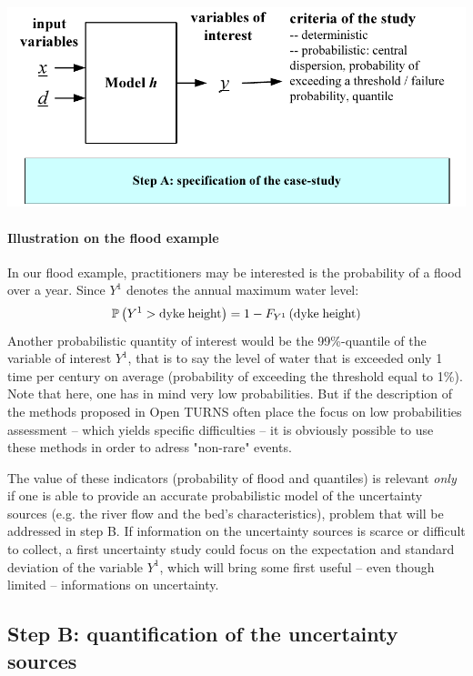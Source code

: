 \begin{center}
  \includegraphics[scale=0.8]{flow2.pdf}
\end{center}

\paragraph{Illustration on the flood example}
\par

In our flood example, practitioners may be interested is the probability of a flood over a year. Since $Y^1$ denotes the annual maximum water level:
$$
\mathbb{P} \left( Y^1 > \textrm{dyke\;height} \right) = 1 - F_{Y^1} \left( \textrm{dyke\;height} \right)
$$
Another probabilistic quantity of interest would be the 99\%-quantile of the variable of interest $Y^1$, that is to say the level of water that is exceeded only 1 time per century on average (probability of exceeding the threshold equal to 1\%). Note that here, one has in mind very low probabilities. But if the description of the methods proposed in Open TURNS often place the focus on low probabilities assessment -- which yields specific difficulties -- it is obviously possible to use these methods in order to adress "non-rare" events.

The value of these indicators (probability of flood and quantiles) is relevant {\em only} if one is able to provide an accurate probabilistic model of the uncertainty sources (e.g. the river flow and the bed's characteristics), problem that will be addressed in step B. If information on the uncertainty sources is scarce or difficult to collect, a first uncertainty study could focus on the expectation and standard deviation of the variable $Y^1$, which will bring some first useful -- even though limited -- informations on uncertainty.

\subsection{Step B: quantification of the  uncertainty sources}

